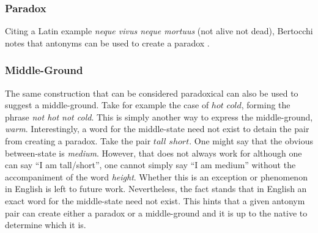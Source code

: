 \subsubsection{Paradox}
Citing a Latin example \textit{neque vivus neque mortuus} (not alive not dead), Bertocchi notes that antonyms can be used to create a paradox \cite{Bertocchi}.  

\subsubsection{Middle-Ground}
The same construction that can be considered paradoxical can also be used to suggest a middle-ground.  Take for example the case of $hot$ \opp $cold$, forming the phrase \textit{not hot not cold}.  This is simply another way to express the middle-ground, \textit{warm}.  Interestingly, a word for the middle-state need not exist to detain the pair from creating a paradox.  Take the pair $tall$ \opp $short$.  One might say that the obvious between-state is \textit{medium}.  However, that does not always work for although one can say ``I am tall/short'', one cannot simply say ``I am medium'' without the accompaniment of the word \textit{height}.  Whether this is an exception or phenomenon in English is left to future work.  Nevertheless, the fact stands that in English an exact word for the middle-state need not exist.  This hints that a given antonym pair can create either a paradox or a middle-ground and it is up to the native to determine which it is.  


